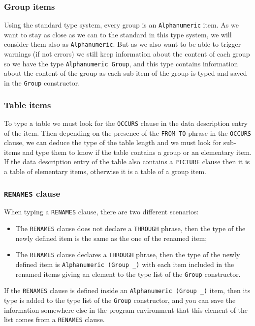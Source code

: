 \documentclass[a4paper,10pt]{article}
\newcommand{\ocamli}[1]{\texttt{#1}}
\newcommand{\coboli}[1]{\texttt{#1}}
\newcommand{\picturec}[1]{\texttt{PICTURE} clause#1}
\begin{document}
\subsubsection{Group items}
Using the standard type system, every group is an \ocamli{Alphanumeric} item. As we want to stay
as close as we can to the standard in this type system, we will consider them also as \ocamli{Alphanumeric}.
But as we also want to be able to trigger warnings (if not errors) we still keep information about
the content of each group so we have the type \ocamli{Alphanumeric Group}, and this type contains
information about the content of the group as each sub item of the group is typed and saved in the
\ocamli{Group} constructor.

\subsubsection{Table items}
To type a table we must look for the \coboli{OCCURS} clause in the data description entry of the
item. Then depending on the presence of the \coboli{FROM TO} phrase in the \coboli{OCCURS} clause, we
can deduce the type of the table length and we must look for sub-items and type them to know if the
table contains a group or an elementary item. If the data description entry of the table also contains
a \picturec{} then it is a table of elementary items, otherwise it is a table of a group item.

\subsubsection{\coboli{RENAMES} clause}
When typing a \coboli{RENAMES} clause, there are two different scenarios:
\begin{itemize}
  \item The \coboli{RENAMES} clause does not declare a \coboli{THROUGH} phrase, then the type of
    the newly defined item is the same as the one of the renamed item;
  \item The \coboli{RENAMES} clause declares a \coboli{THROUGH} phrase, then the type of the newly
    defined item is \ocamli{Alphanumeric (Group _)} with each item included in the renamed items
    giving an element to the type list of the \ocamli{Group} constructor.
\end{itemize}
If the \coboli{RENAMES} clause is defined inside an \ocamli{Alphanumeric (Group _)} item, then
its type is added to the type list of the \ocamli{Group} constructor, and you can save the information
somewhere else in the program environment that this element of the list comes from a \coboli{RENAMES}
clause.
\end{document}
